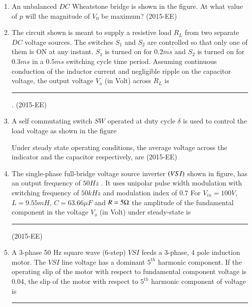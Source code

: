 \documentclass[journal]{IEEEtran}
\begin{document}
\begin{enumerate}
    \item An unbalanced $DC$
 Wheatstone bridge is shown in the figure. At what value of $p$
 will the magnitude of $V_0$
 be maximum? \hfill(2015-EE)
 
 \begin{enumerate}
 \end{enumerate}
 \item The circuit shown is meant to supply a resistive load $R_L$
 from two separate $DC$
 voltage sources. The switches $S_1$
 and $S_2$
 are controlled so that only one of them is ON at any instant. $S_1$
 is turned on for $0.2ms$
 and $S_2$
 is turned on for $0.3ms$
 in a $0.5ms$
 switching cycle time period. Assuming continuous conduction of the inductor current and negligible ripple on the capacitor voltage, the output voltage $V_o$
 (in Volt) across $R_L$
 is \rule{2cm}{0.4pt}. \hfill(2015-EE)
 
 \item A self commutating switch $SW$ 
 operated at duty cycle $\delta$
 is used to control the load voltage as shown in the figure
 
 Under steady state operating conditions, the average voltage across the indicator and the capacitor respectively, are \hfill(2015-EE)
 \begin{enumerate}
 \end{enumerate}
 \item The single-phase full-bridge voltage source inverter $\left(VSI\right)$
 shown in figure, has an output frequency of $50Hz$
. It uses unipolar pulse width modulation with switching frequency of $50kHz$
 and modulation index of $0.7$
 For $V_{in} = 100V$, $L = 9.55mH$, $C = 63.66\mu F$
 and $R = 5 \ohm$
 the amplitude of the fundamental component in the voltage $V_o$ (in Volt) under steady-state is \rule{2cm}{0.4pt} \hfill(2015-EE)
 
 \item A 3-phase 50 Hz square wave (6-step) $VSI$ feeds a 3-phase, 4 pole induction motor. The $VSI$ line voltage has a dominant $5^{th}$ harmonic component. If the operating slip of the motor with respect to fundamental component voltage is 0.04, the slip of the motor with respect to $5^{th}$ harmonic component of voltage is \rule{1cm}{0.4pt} 
 

\end{enumerate}
\end{document}

